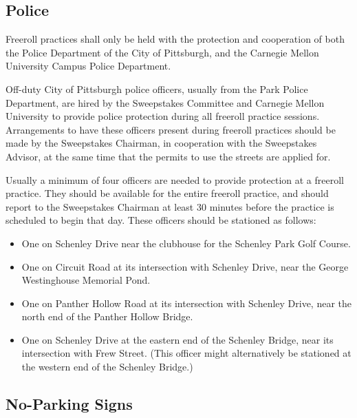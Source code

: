 \subsection{Police}

	Freeroll practices shall only be held with the protection and cooperation of
	both the Police Department of the City of Pittsburgh, and the Carnegie Mellon
	University Campus Police Department.

	Off-duty City of Pittsburgh police officers, usually from the Park Police
	Department, are hired by the Sweepstakes Committee and Carnegie Mellon
	University to provide police protection during all freeroll practice sessions.
	Arrangements to have these officers present during freeroll practices should be
	made by the Sweepstakes Chairman, in cooperation with the Sweepstakes Advisor,
	at the same time that the permits to use the streets are applied for.

	Usually a minimum of four officers are needed to provide protection at a
	freeroll practice. They should be available for the entire freeroll practice,
	and should report to the Sweepstakes Chairman at least 30 minutes before the
	practice is scheduled to begin that day. These officers should be stationed as
	follows:

	\begin{itemize}

		\item One on Schenley Drive near the clubhouse for the Schenley Park Golf
		Course.

		\item One on Circuit Road at its intersection with Schenley Drive, near the
		George Westinghouse Memorial Pond.

		\item One on Panther Hollow Road at its intersection with Schenley Drive,
		near the north end of the Panther Hollow Bridge.

		\item One on Schenley Drive at the eastern end of the Schenley Bridge, near
		its intersection with Frew Street. (This officer might alternatively be
		stationed at the western end of the Schenley Bridge.)

	\end{itemize}

\subsection{No-Parking Signs}

